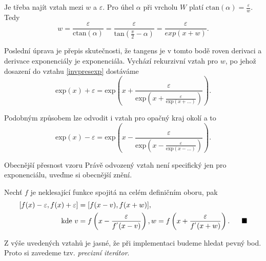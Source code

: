 Je třeba najít vztah mezi $w$ a $\varepsilon$. Pro úhel $\alpha$ při vrcholu $W$ platí $\mathrm{ctan}(\alpha) = \frac{\varepsilon}{w}$. Tedy
\begin{equation}
w = \frac{\varepsilon}{\mathrm{ctan}(\alpha)} = \frac{\varepsilon}{\mathrm{tan}(\frac{\pi}{2}-\alpha)} = \frac{\varepsilon}{exp(x+w)}.
\end{equation}

Poslední úprava je přepis skutečnosti, že tangens je v tomto bodě roven derivaci a derivace exponenciály je exponenciála. Vychází rekurzivní vztah pro $w$, po jehož dosazení do vztahu \eqref{invpresexp} dostáváme
\begin{equation}\label{rekpresexp}
\mathrm{exp}(x)+\varepsilon=\mathrm{exp}\left(x+\frac{\varepsilon}{\mathrm{exp}\left(x+\frac{\varepsilon}{\mathrm{exp}(x+\ldots)}\right)}\right).
\end{equation}

Podobným způsobem lze odvodit i vztah pro opačný kraj okolí a to
\begin{equation}\label{rekpresexp2}
\mathrm{exp}(x)-\varepsilon=\mathrm{exp}\left(x-\frac{\varepsilon}{\mathrm{exp}\left(x-\frac{\varepsilon}{\mathrm{exp}(x-\ldots)}\right)}\right).
\end{equation}

\begin{myremarkbez}{Obecnější přesnost vzoru}
Právě odvozený vztah není specifický jen pro exponenciálu, uveďme si obecnější znění.
\begin{fact}\label{lem:presprom}Nechť $f$ je neklesající funkce spojitá na celém definičním oboru, pak
\begin{equation}\label{eq:presprom}
\begin{aligned}
[f(x)-\varepsilon , f(x)+\varepsilon]&=[f(x-v),f(x+w)],\\\text{~kde~}v&=f\left(x-\frac{\varepsilon}{f^{'}(x-v)}\right),w=f\left(x+\frac{\varepsilon}{f^{'}(x+w)}\right).\mathrm{~~~~~\hfill}\blacksquare
\end{aligned}
\end{equation}
\end{fact}
\end{myremarkbez}

Z výše uvedených vztahů je jasné, že při implementaci budeme hledat pevný bod. Proto si zavedeme tzv. \textit{precizní iterátor}.

